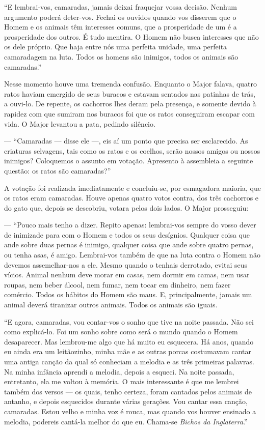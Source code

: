 ``E lembrai-vos, camaradas, jamais deixai fraquejar vossa decisão. Nenhum argumento poderá deter-vos. Fechai os ouvidos quando vos disserem que o Homem e os animais têm interesses comuns, que a prosperidade de um é a prosperidade dos outros. É tudo mentira. O Homem não busca interesses que não os dele próprio. Que haja entre nós uma perfeita unidade, uma perfeita camaradagem na luta. Todos os homens são inimigos, todos os animais são camaradas.''

Nesse momento houve uma tremenda confusão. Enquanto o Major falava, quatro ratos haviam emergido de seus buracos e estavam sentados nas patinhas de trás, a ouvi-lo. De repente, os cachorros lhes deram pela presença, e somente devido à rapidez com que sumiram nos buracos foi que os ratos conseguiram escapar com vida. O Major levantou a pata, pedindo silêncio.

--- ``Camaradas --- disse ele ---, eis aí um ponto que precisa ser esclarecido. As criaturas selvagens, tais como os ratos e os coelhos, serão nossos amigos ou nossos inimigos? Coloquemos o assunto em votação. Apresento à assembleia a seguinte questão: os ratos são camaradas?''

A votação foi realizada imediatamente e concluiu-se, por esmagadora maioria, que os ratos eram camaradas. Houve apenas quatro votos contra, dos três cachorros e do gato que, depois se descobriu, votara pelos dois lados. O Major prosseguiu:

--- ``Pouco mais tenho a dizer. Repito apenas: lembrai-vos sempre do vosso dever de inimizade para com o Homem e todos os seus desígnios. Qualquer coisa que ande sobre duas pernas é inimigo, qualquer coisa que ande sobre quatro pernas, ou tenha asas, é amigo. Lembrai-vos também de que na luta contra o Homem não devemos assemelhar-nos a ele. Mesmo quando o tenhais derrotado, evitai seus vícios. Animal nenhum deve morar em casas, nem dormir em camas, nem usar roupas, nem beber álcool, nem fumar, nem tocar em dinheiro, nem fazer comércio. Todos os hábitos do Homem são maus. E, principalmente, jamais um animal deverá tiranizar outros animais. Todos os animais são iguais.

``E agora, camaradas, vou contar-vos o sonho que tive na noite passada. Não sei como explicá-lo. Foi um sonho sobre como será o mundo quando o Homem desaparecer. Mas lembrou-me algo que há muito eu esquecera. Há anos, quando eu ainda era um leitãozinho, minha mãe e as outras porcas costumavam cantar uma antiga canção da qual só conheciam a melodia e as três primeiras palavras. Na minha infância aprendi a melodia, depois a esqueci. Na noite passada, entretanto, ela me voltou à memória. O mais interessante é que me lembrei também dos versos --- os quais, tenho certeza, foram cantados pelos animais de antanho, e depois esquecidos durante várias gerações. Vou cantar essa canção, camaradas. Estou velho e minha voz é rouca, mas quando vos houver ensinado a melodia, podereis cantá-la melhor do que eu. Chama-se \textit{Bichos da Inglaterra}.''

